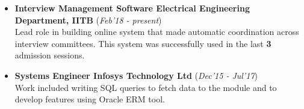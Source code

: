 \documentclass[10pt]{article}
\begin{document}
\colorbox{bl}{}
\vspace{-0.6cm}
\begin{itemize}[leftmargin=0.4cm]
	\item \textbf{Interview Management Software \textpipe  \hspace{0.05cm} Electrical Engineering Department, IITB} \hfill{(\textit{Feb'18 - present})}\\
\vspace{-0.1cm}
\hspace{-0.09cm}Lead role in building online system that made automatic coordination across interview committees. This system was successfully used in the last \textbf{3} admission sessions.

\end{itemize}
	\vspace{-0.35cm}

\begin{itemize}[leftmargin=0.4cm]
	\item \textbf{Systems Engineer \textpipe  \hspace{0.05cm} Infosys Technology Ltd} \hfill{(\textit{Dec'15 - Jul'17})}\\
		 Work included writing SQL queries to fetch data to the module and to develop features using Oracle ERM tool.
\end{itemize}
\vspace{-0.1cm}
\end{document}
